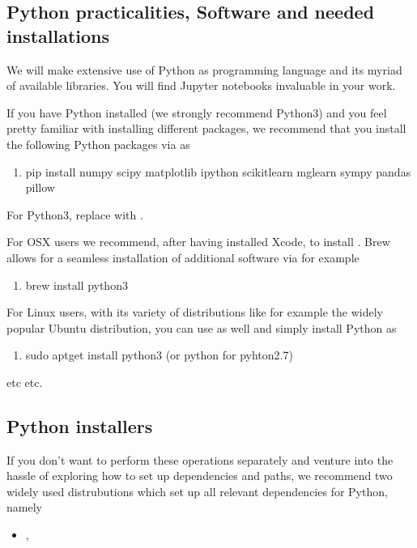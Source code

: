 \documentclass[letterpaper,10pt,english]{sphinxmanual}
\begin{document}
\subsection{Python practicalities, Software and needed installations}
\label{\detokenize{chapter2:python-practicalities-software-and-needed-installations}}
We will make extensive use of Python as programming language and its
myriad of available libraries.  You will find
Jupyter notebooks invaluable in your work.

If you have Python installed (we strongly recommend Python3) and you feel
pretty familiar with installing different packages, we recommend that
you install the following Python packages via  as
\begin{enumerate}
%
\item {} 
pip install numpy scipy matplotlib ipython scikit\sphinxhyphen{}learn mglearn sympy pandas pillow

\end{enumerate}

For Python3, replace  with .

For OSX users we recommend, after having installed Xcode, to
install . Brew allows for a seamless installation of additional
software via for example
\begin{enumerate}
%
\item {} 
brew install python3

\end{enumerate}

For Linux users, with its variety of distributions like for example the widely popular Ubuntu distribution,
you can use  as well and simply install Python as
\begin{enumerate}
%
\item {} 
sudo apt\sphinxhyphen{}get install python3  (or python for pyhton2.7)

\end{enumerate}

etc etc.


\subsection{Python installers}
\label{\detokenize{chapter2:python-installers}}
If you don’t want to perform these operations separately and venture
into the hassle of exploring how to set up dependencies and paths, we
recommend two widely used distrubutions which set up all relevant
dependencies for Python, namely
\begin{itemize}
\item {} 
,

\end{itemize}
\end{document}
